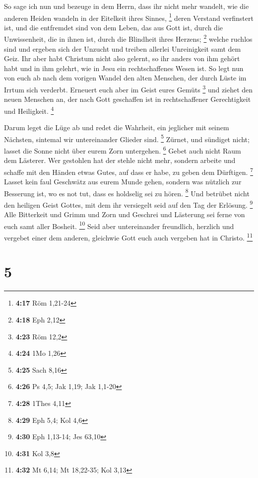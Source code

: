  So sage ich nun und bezeuge in dem Herrn, dass ihr nicht
mehr wandelt, wie die anderen Heiden wandeln in der Eitelkeit ihres
Sinnes, \footnote{\textbf{4:17} Röm 1,21-24}  deren
Verstand verfinstert ist, und die entfremdet sind von dem Leben, das aus
Gott ist, durch die Unwissenheit, die in ihnen ist, durch die Blindheit
ihres Herzens; \footnote{\textbf{4:18} Eph 2,12}  welche
ruchlos sind und ergeben sich der Unzucht und treiben allerlei
Unreinigkeit samt dem Geiz.  Ihr aber habt Christum nicht
also gelernt,  so ihr anders von ihm gehört habt und in ihm
gelehrt, wie in Jesu ein rechtschaffenes Wesen ist.  So
legt nun von euch ab nach dem vorigen Wandel den alten Menschen, der
durch Lüste im Irrtum sich verderbt.  Erneuert euch aber im
Geist eures Gemüts \footnote{\textbf{4:23} Röm 12,2}  und
ziehet den neuen Menschen an, der nach Gott geschaffen ist in
rechtschaffener Gerechtigkeit und Heiligkeit. \footnote{\textbf{4:24}
  1Mo 1,26}

 Darum leget die Lüge ab und redet die Wahrheit, ein
jeglicher mit seinem Nächsten, sintemal wir untereinander Glieder sind.
\footnote{\textbf{4:25} Sach 8,16}  Zürnet, und sündiget
nicht; lasset die Sonne nicht über eurem Zorn untergehen. \footnote{\textbf{4:26}
  Ps 4,5; Jak 1,19; Jak 1,1-20}  Gebet auch nicht Raum dem
Lästerer.  Wer gestohlen hat der stehle nicht mehr, sondern
arbeite und schaffe mit den Händen etwas Gutes, auf dass er habe, zu
geben dem Dürftigen. \footnote{\textbf{4:28} 1Thes 4,11} 
Lasset kein faul Geschwätz aus eurem Munde gehen, sondern was nützlich
zur Besserung ist, wo es not tut, dass es holdselig sei zu hören.
\footnote{\textbf{4:29} Eph 5,4; Kol 4,6}  Und betrübet
nicht den heiligen Geist Gottes, mit dem ihr versiegelt seid auf den Tag
der Erlösung. \footnote{\textbf{4:30} Eph 1,13-14; Jes 63,10}
 Alle Bitterkeit und Grimm und Zorn und Geschrei und
Lästerung sei ferne von euch samt aller Bosheit. \footnote{\textbf{4:31}
  Kol 3,8}  Seid aber untereinander freundlich, herzlich
und vergebet einer dem anderen, gleichwie Gott euch auch vergeben hat in
Christo. \footnote{\textbf{4:32} Mt 6,14; Mt 18,22-35; Kol 3,13}

\hypertarget{section-2}{%
\section{5}\label{section-2}}

